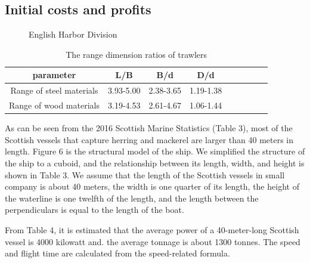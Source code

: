\documentclass{mcmthesis}
\begin{document}
\subsection{Initial costs and profits}
\begin{figure}[h]
  \caption{English Harbor Division}\label{figure1}
\end{figure}

\begin{table}[!htb]
\centering
\setlength{\abovecaptionskip}{0pt}%
\setlength{\belowcaptionskip}{15pt}%
\caption{The range dimension ratios of  trawlers}
\begin{tabular}{ccccccccc}
\toprule[1.5pt]
parameter &L/B&B/d&D/d\\
\toprule[1.5pt]
Range of steel materials&3.93-5.00&2.38-3.65&1.19-1.38\\
Range of wood materials&3.19-4.53&2.61-4.67&1.06-1.44\\
\bottomrule[1.5pt]
\end{tabular}
\end{table}

As can be seen from the 2016 Scottish Marine Statistics (Table 3), most of the Scottish vessels that capture herring and mackerel are larger than 40 meters in length. Figure 6 is the structural model of the ship. We simplified the structure of the ship to a cuboid, and the relationship between its length, width, and height is shown in Table 3. We assume that the length of the Scottish vessels in small company is about 40 meters, the width is one quarter of its length, the height of the waterline is one twelfth of the length, and the length between the  perpendiculars  is equal to the length of the boat.


From Table 4, it is estimated that the average power of a 40-meter-long Scottish vessel is 4000 kilowatt and. the average tonnage is about 1300 tonnes. The speed and flight time are calculated from the speed-related formula.
\end{document}
